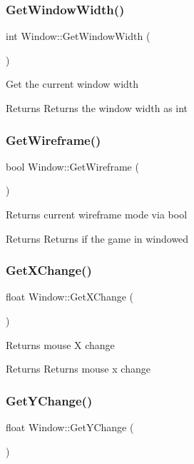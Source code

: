 \subsubsection{\texorpdfstring{GetWindowWidth()}{GetWindowWidth()}}
{\footnotesize\ttfamily int Window\+::\+Get\+Window\+Width (\begin{DoxyParamCaption}{ }\end{DoxyParamCaption})}

Get the current window width \begin{DoxyReturn}{Returns}
Returns the window width as int 
\end{DoxyReturn}
\mbox{\label{class_window_a913c93756ba0357f75493ad64a265c36}} 
\subsubsection{\texorpdfstring{GetWireframe()}{GetWireframe()}}
{\footnotesize\ttfamily bool Window\+::\+Get\+Wireframe (\begin{DoxyParamCaption}{ }\end{DoxyParamCaption})}

Returns current wireframe mode via bool \begin{DoxyReturn}{Returns}
Returns if the game in windowed 
\end{DoxyReturn}
\mbox{\label{class_window_a777dd058c4e998417c9b374525ea1a1c}} 
\subsubsection{\texorpdfstring{GetXChange()}{GetXChange()}}
{\footnotesize\ttfamily float Window\+::\+Get\+X\+Change (\begin{DoxyParamCaption}{ }\end{DoxyParamCaption})}

Returns mouse X change \begin{DoxyReturn}{Returns}
Returns mouse x change 
\end{DoxyReturn}
\mbox{\label{class_window_a632bb091879d4541c9227ed1fd05136b}} 
\subsubsection{\texorpdfstring{GetYChange()}{GetYChange()}}
{\footnotesize\ttfamily float Window\+::\+Get\+Y\+Change (\begin{DoxyParamCaption}{ }\end{DoxyParamCaption})}

